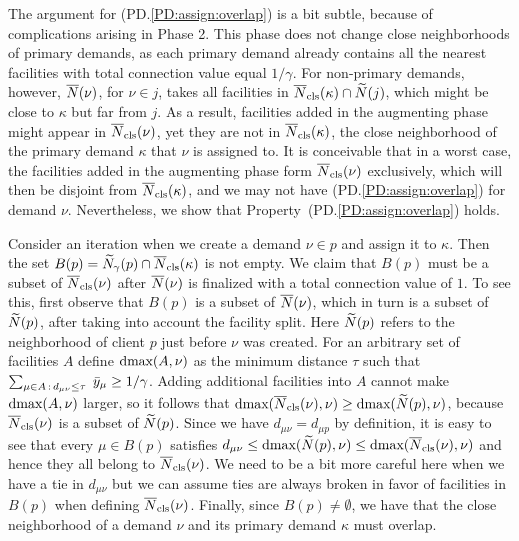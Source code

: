 \documentclass{llncs}
\begin{document}
The argument for (PD.\ref{PD:assign:overlap}) is a bit subtle, because
of complications arising in Phase 2.  This phase does not change close
neighborhoods of primary demands, as each primary demand already
contains all the nearest facilities with total connection value equal
$1/\gamma$.  For non-primary demands, however, ${\overline{N}}(\nu)$, for
$\nu\in j$, takes all facilities in ${\overline{N}}_{\text{cls}}(\kappa)\cap
{\widetilde N}(j)$, which might be close to $\kappa$ but far from $j$.  As a
result, facilities added in the augmenting phase might appear in
${\overline{N}}_{\text{cls}}(\nu)$, yet they are not in ${\overline{N}}_{\text{cls}}(\kappa)$, the close
neighborhood of the primary demand $\kappa$ that $\nu$ is assigned
to. It is conceivable that in a worst case, the facilities added in
the augmenting phase form ${\overline{N}}_{\text{cls}}(\nu)$ exclusively, which will
then be disjoint from ${\overline{N}}_{\text{cls}}(\kappa)$, and we may not have
(PD.\ref{PD:assign:overlap}) for demand $\nu$. Nevertheless, we show
that Property~(PD.\ref{PD:assign:overlap}) holds.

Consider an iteration when we create a demand $\nu\in p$
and assign it to $\kappa$. Then the set
$B(p)={\widetilde N}_{\gamma}(p)\cap {\overline{N}}_{\text{cls}}(\kappa)$ is not empty.
We claim that
$B(p)$ must be a subset of ${\overline{N}}_{\text{cls}}(\nu)$ after ${\overline{N}}(\nu)$ is
finalized with a total connection value of $1$. To see this, first
observe that $B(p)$ is a subset of ${\overline{N}}(\nu)$, which in turn is a
subset of ${\widetilde N}(p)$, after taking into account the facility
split. Here ${\widetilde N}(p)$ refers to the neighborhood of client $p$
just before $\nu$ was created. For an arbitrary set of facilities
$A$ define $\text{dmax}(A, \nu)$ as the minimum distance $\tau$ such
that $\sum_{\mu\in A {\,:\,} d_{\mu\nu} \leq \tau}\;{\bar y}_{\mu} \geq
1/\gamma$.
Adding additional facilities into $A$ cannot make
$\text{dmax}(A, \nu)$ larger, so it follows that $\text{dmax}({\overline{N}}_{\text{cls}}(\nu), \nu)
\geq \text{dmax}({\widetilde N}(p), \nu)$, because ${\overline{N}}_{\text{cls}}(\nu)$ is a subset of
${\widetilde N}(p)$. Since we have $d_{\mu \nu} = d_{\mu p}$ by definition,
it is easy to see that every $\mu \in B(p)$ satisfies $d_{\mu \nu}
\leq \text{dmax}({\widetilde N}(p), \nu) \leq \text{dmax}({\overline{N}}_{\text{cls}}(\nu), \nu)$ and
hence they all belong to ${\overline{N}}_{\text{cls}}(\nu)$. We need to be a bit more
careful here when we have a tie in $d_{\mu\nu}$ but we can assume ties
are always broken in favor of facilities in $B(p)$ when defining
${\overline{N}}_{\text{cls}}(\nu)$. Finally, since $B(p)\neq\emptyset$, we have that the
close neighborhood of a demand $\nu$ and its primary demand $\kappa$
must overlap.

\end{document}
